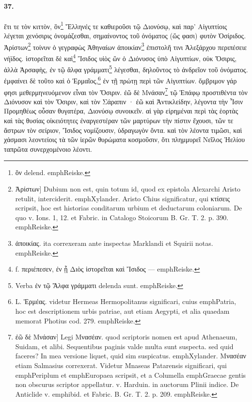 \documentclass[a4paper, 11pt, oneside, polutonikogreek, german]{article}
\begin{document}
\paragraph{37.}
ἔτι τε τὸν κιττὸν, ὃν\footnote{ὃν delend. emph{Reiske.}} Ἕλληνές τε καθιεροῦσι τῷ Διονύσῳ, καὶ παρ' Αἰγυπτίοις λέγεται χενόσιρις ὀνομάζεσθαι, σημαίνοντος τοῦ ὀνόματος (ὥς φασι) φυτὸν Ὀσίριδος. Ἀρίστων\footnote{Ἀρίστων] Dubium non est, quin totum id, quod ex epistola Alexarchi Aristo retulit, interciderit. emph{Xylander.} Aristo Chius significatur, qui κτίσεις scripsit, hoc est historias conditarum urbium et deductarum coloniarum. De quo v. Ions. 1, 12. et Fabric. in Catalogo Stoicorum B. Gr. T. 2. p. 390. emph{Reiske.}} τοίνυν ὁ γεγραφὼς Ἀθηναίων ἀποικίαν\footnote{ἀποικίας. ita correxeram ante inspectas Marklandi et Squirii notas. emph{Reiske.}} ἐπιστολῆ τινι Ἀλεξάρχου περιπέσειε νήϊδος. ἱστορεῖται δὲ καὶ\footnote{f. περιέπεσεν, ἐν ᾗ Διὸς ἱστορεῖται καὶ Ἴσιδος --- emph{Reiske.}} Ἴσιδος υἱὸς ὢν ὁ Διόνυσος ὑπὸ Αἰγυπτίων, οὐκ Ὄσιρις, ἀλλὰ Ἀρσαφὴς, ἐν τῷ ἄλφα γράμματι\footnote{Verba ἐν τῷ Ἄλφα γράμματι delenda sunt. emph{Reiske.}} λέγεσθαι, δηλοῦντος τὸ ἀνδρεῖον τοῦ ὀνόματος. ἐμφαίνει δὲ τοῦτο καὶ ὁ Ἑρμαῖος,\footnote{L. Ἑρμέας. videtur Hermeas Hermopolitanus significari, cuius emph{Patria}, hoc est descriptionem urbis patriae, aut etiam Aegypti, et alia quaedam memorat Photius cod. 279. emph{Reiske.}} ἐν τῇ πρώτῃ περὶ τῶν Αἰγυπτίων. ὄμβριμον γάρ φησι μεθερμηνευόμενον εἶναι τὸν Ὄσιριν. ἐῶ δὲ Μνάσαν\footnote{ἐῶ δὲ Μνάσαν] Legi Μνασέαν. quod scriptoris nomen est apud Athenaeum, Suidam, et alibi. Sequentibus paginis valde multa sunt suspecta. sed quid faceres? In mea versione liquet, quid sim suspicatus. emph{Xylander.} Μνασέαν etiam Salmasius correxerat. Videtur Mnaseas Patarensis significari, qui emph{Periplum} et emph{Europaea} scripsit, et a Columella emph{Graecae gentis non obscurus scriptor} appellatur. v. Harduin. in auctorum Plinii indice. De Anticlide v. emph{ibid.} et Fabric. B. Gr. T. 2. p. 209. emph{Reiske.}} τῷ Ἐπάφῳ προστιθέντα τὸν Διόνυσον καὶ τὸν Ὄσιριν, καὶ τὸν Σάραπιν · ἐῶ καὶ Ἀντικλείδην, λέγοντα τὴν Ἶσιν Προμηθέως οὖσαν θυγατέρα, Διονύσῳ συνοικεῖν. αἱ γὰρ εἰρημέναι περὶ τὰς ἑορτὰς καὶ τὰς θυσίας οἰκειότητες ἐναργεστέραν τῶν μαρτύρων τὴν πίστιν ἔχουσι, τῶν τε ἄστρων τὸν σείριον, Ἴσιδος νομίζουσιν, ὑδραγωγὸν ὄντα. καὶ τὸν λέοντα τιμῶσι, καὶ χάσμασι λεοντείοις τὰ τῶν ἱερῶν θυρώματα κοσμοῦσιν, ὅτι πλημμυρεῖ Νεῖλος Ἠελίου ταπρῶτα συνερχομένοιο λέοντι.
\end{document}
